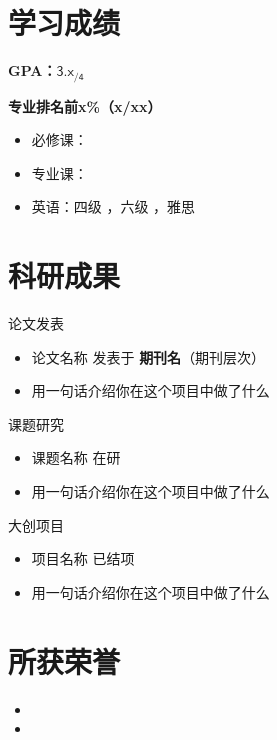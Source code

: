 \documentclass[11pt]{article}
\newlength{\iconwidth}
\begin{document}
    \begin{minipage}[t]{\textwidth}
    \section[学习成绩]{\makebox[\iconwidth][c]{\color{primary_color}{\faChalkboardTeacher}}\quad 学习成绩}
    \textbf{GPA：$\mathsf{3.x_{/4}}$} \

    \textbf{专业排名前x\%（x/xx）}
    \begin{itemize}[parsep=0.5ex]
	\item 必修课：
	\item 专业课：
	\item 英\quad 语：四级  ，六级  ，雅思  
    \end{itemize}
    
    \section[科研成果]{\makebox[\iconwidth][c]{\color{primary_color}{\faAtom}}\quad 科研成果}

    论文发表
    \begin{itemize}
        \item 论文名称 \hfill 发表于 \textbf{期刊名}（期刊层次）
        \item 用一句话介绍你在这个项目中做了什么
    \end{itemize}

    \vspace{0.5em}
    课题研究
    \begin{itemize}
        \item 课题名称 \hfill 在研
        \item 用一句话介绍你在这个项目中做了什么
    \end{itemize}

    \vspace{0.5em}
    大创项目
    \begin{itemize}
        \item \textbf{}项目名称 \hfill 已结项
        \item 用一句话介绍你在这个项目中做了什么
    \end{itemize}
    
    \vspace{1.2em}
    \end{minipage}

    \begin{minipage}[t]{\textwidth}
    \section[所获荣誉]{\makebox[\iconwidth][c]{\color{primary_color}{\faInfo}}\quad 所获荣誉}
    
    \begin{itemize}
        \item 
        \item  
    \end{itemize}
    
    \vspace{1.2em}
    \end{minipage}
    
\end{document}
